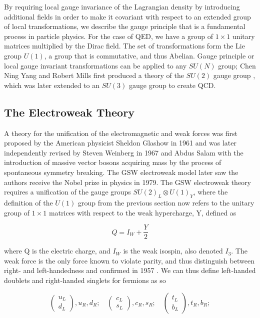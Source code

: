 By requiring local gauge invariance of the Lagrangian density by introducing additional fields in order to make it covariant with respect to an extended group of local transformations, we describe the gauge principle that is a fundamental process in particle physics. For the case of QED, we have a group of $1 \times 1$ unitary matrices multiplied by the Dirac field. The set of transformations form the Lie group $U(1)$, a group that is commutative, and thus Abelian. Gauge principle or local gauge invariant transformations can be applied to any $SU(N)$ group; Chen Ning Yang and Robert Mills first produced a theory of the $SU(2)$ gauge group \cite{PhysRev.96.191}, which was later extended to an $SU(3)$ gauge group to create QCD.  

\subsection{The Electroweak Theory} \label{subsec-ElectroweakTheory}

A theory for the unification of the electromagnetic and weak forces was first proposed by the American physicist Sheldon Glashow in 1961 \cite{Glashow:1961tr} and was later independently revised by Steven Weinberg in 1967 \cite{PhysRevLett.19.1264} and Abdus Salam \cite{Salam:1959zz} with the introduction of massive vector bosons acquiring mass by the process of spontaneous symmetry breaking. The GSW electroweak model later saw the authors receive the Nobel prize in physics in 1979. The GSW electroweak theory requires a unification of the gauge groups $SU(2)_L \otimes U(1)_Y$, where the definition of the $U(1)$ group from the previous section now refers to the unitary group of $1 \times 1$ matrices with respect to the weak hypercharge, Y, defined as 

\begin{equation}
Q = I_W + \frac{Y}{2}
\end{equation}

where Q is the electric charge, and $I_W$ is the weak isospin, also denoted $I_3$. The weak force is the only force known to violate parity, and thus distinguish between right- and left-handedness and confirmed in 1957 \cite{PhysRev.105.1413}. We can thus define left-handed doublets and right-handed singlets for fermions as so

\begin{equation}
\begin{pmatrix}
u_L \\
d_L
\end{pmatrix}
,u_R,d_R;
\quad
\begin{pmatrix}
c_L \\
s_L
\end{pmatrix}
,c_R, s_R;
\quad
\begin{pmatrix}
t_L \\
b_L
\end{pmatrix}
,t_R, b_R;
\end{equation}

